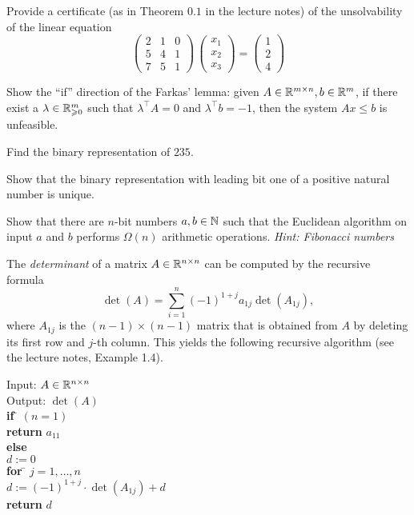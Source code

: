 \documentclass[11pt]{article}
\institute{\'Ecole Polytechnique F\'ed\'erale de Lausanne}
\begin{document}
\makeheader

\problem
Provide a certificate (as in Theorem $0.1$ in the lecture notes) of the unsolvability of the linear equation 
  \begin{displaymath}
    \begin{pmatrix}
      2 & 1 & 0 \\
      5 & 4 & 1 \\
      7 & 5 & 1
    \end{pmatrix} \,
    \begin{pmatrix}
      x_1 \\ x_2 \\ x_3 
    \end{pmatrix} =
    \begin{pmatrix}
      1\\2\\4
    \end{pmatrix}
  \end{displaymath}

 \problem Show the ``if'' direction of the Farkas' lemma: given $A\in \mathbb{R}^{m\times n}, b\in \mathbb{R}^m$, if there exist a $\lambda \in \mathbb{R}^m_{\geqslant 0}$ such that $\lambda^\top A=0$ and $\lambda^\top b=-1$, then the system $Ax\leq b$ is unfeasible. 

\problem Find the binary representation of $235$. 

\problem Show that the binary representation with leading bit one of a positive natural number is unique.
 
\problem Show that there are $n$-bit numbers $a,b \in \mathbb{N}$ such that the  Euclidean algorithm on input $a$ and $b$ performs  $\Omega(n)$ arithmetic operations. \emph{Hint: Fibonacci numbers} 

\problem 
The \emph{determinant} of a matrix $A \in \mathbb{R}^{n \times n}$ can be computed by the recursive formula 
\begin{displaymath}
  \det(A) = \sum_{i=1}^n (-1)^{1+j}a_{1j} \det(A_{1j}),
\end{displaymath}
where $A_{1j}$ is the $(n-1)×(n-1)$ matrix that is obtained from $A$ by deleting its first row and $j$-th column.  This yields the following recursive algorithm (see the lecture notes, Example 1.4). 

\begin{tabbing}
  Input: $A \in \mathbb{R}^{n \times n}$ \\
  Output: $\det(A)$ \\
  
  {\bf if} \= $(n=1)$ \\
           \> {\bf return} $a_{11}$ \\
  {\bf else} \\
           \> $d:=0$  \\
           \> {\bf for } \= $j=1,\dots,n$ \\
           \>            \> $d:= (-1)^{1+j}⋅ \det(A_{1j}) +d$\\
           \> {\bf return} $d$   
\end{tabbing}
\end{document}
